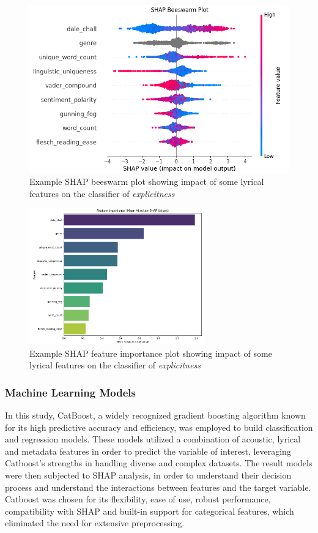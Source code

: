 \begin{center}
\begin{figure}[ht]
  \centering
  \includegraphics[width=4.5in]{img/shap_beeswarm.png}
  \caption{Example SHAP beeswarm plot showing impact of some lyrical features
  on the classifier of \textit{explicitness}}
  \label{Figure:fig_beh}
\end{figure}
\end{center}

\begin{center}
\begin{figure}[ht]
  \centering
  \includegraphics[width=3in]{img/shap_feature_importance.png}
  \caption{Example SHAP feature importance plot showing impact of some lyrical features
  on the classifier of \textit{explicitness}}
  \label{Figure:fig_beh}
\end{figure}
\end{center}

\subsubsection*{Machine Learning Models}
In this study, CatBoost, a widely recognized gradient boosting algorithm known
for its high predictive accuracy and efficiency, was employed to build
classification and regression models. These models utilized a combination of
acoustic, lyrical and metadata features in order to predict the variable of
interest, leveraging Catboost's strengths in handling diverse and complex
datasets. The result models were then subjected to SHAP analysis, in order to
understand their decision process and understand the interactions between
features and the target variable. Catboost was chosen for its flexibility, ease
of use, robust performance, compatibility with SHAP and built-in support for
categorical features,  which eliminated the need for extensive preprocessing.

